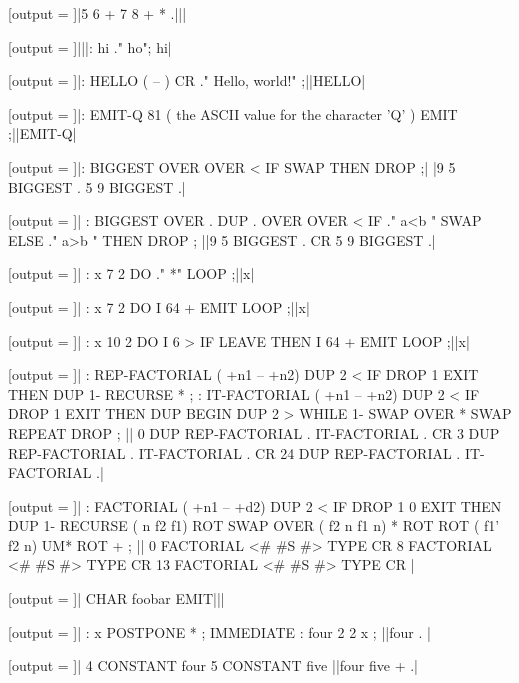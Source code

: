 \RequirePackage{runner}
\newcommand{\result}{}

[output = \result]|5 6 + 7 8 + * .|||
\typeout{\result}

[output = \result]|||: hi ." ho"; hi|
\typeout{\result}

[output = \result]|: HELLO  ( -- )  CR ." Hello, world!" ;||HELLO|
\typeout{\result}

[output = \result]|: EMIT-Q   81 ( the ASCII value for the character 'Q' ) EMIT ;||EMIT-Q|
\typeout{\result}

[output = \result]|: BIGGEST OVER OVER < IF SWAP THEN DROP ;|%
|9 5 BIGGEST . 5 9 BIGGEST .|
\typeout{\result}

[output = \result]|
  : BIGGEST OVER . DUP .
    OVER OVER < IF
      ." a<b " SWAP
    ELSE
      ." a>b "
    THEN
    DROP ;
||9 5 BIGGEST . CR 5 9 BIGGEST .|
\typeout{\result}

[output = \result]|
  : x 7 2 DO ." *" LOOP ;||x|
\typeout{\result}

[output = \result]|
  : x 7 2 DO I 64 + EMIT LOOP ;||x|
\typeout{\result}

[output = \result]|
  : x 10 2 DO I 6 > IF LEAVE THEN I 64 + EMIT LOOP ;||x|
\typeout{\result}

[output = \result]|
  : REP-FACTORIAL ( +n1 -- +n2)
  DUP 2 < IF DROP 1 EXIT THEN
  DUP 1- RECURSE *
  ;
  : IT-FACTORIAL ( +n1 -- +n2)
  DUP 2 < IF DROP 1 EXIT THEN
  DUP
  BEGIN DUP 2 > WHILE
  1- SWAP OVER * SWAP
  REPEAT DROP
  ;
||
0 DUP REP-FACTORIAL . IT-FACTORIAL . CR
3 DUP REP-FACTORIAL . IT-FACTORIAL . CR
24 DUP REP-FACTORIAL . IT-FACTORIAL .|
\typeout{\result}

[output = \result]|
  : FACTORIAL ( +n1 -- +d2)
  DUP 2 < IF DROP 1 0 EXIT THEN
  DUP 1- RECURSE ( n f2 f1)
  ROT SWAP OVER ( f2 n f1 n)
  * ROT ROT ( f1' f2 n)
  UM* ROT +
  ;
||
0 FACTORIAL <# #S #> TYPE CR
8 FACTORIAL <# #S #> TYPE CR
13 FACTORIAL <# #S #> TYPE CR
|
\typeout{\result}

[output = \result]|
  CHAR foobar EMIT|||
\typeout{\result}

[output = \result]|
  : x POSTPONE * ; IMMEDIATE :
  four 2 2 x ;
||four . |
\typeout{\result}

[output = \result]|
  4 CONSTANT four
  5 CONSTANT five
||four five + .|
\typeout{\result}

